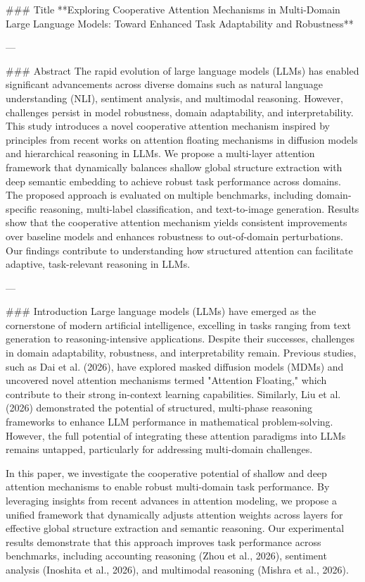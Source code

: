 ### Title  
**Exploring Cooperative Attention Mechanisms in Multi-Domain Large Language Models: Toward Enhanced Task Adaptability and Robustness**

---

### Abstract  
The rapid evolution of large language models (LLMs) has enabled significant advancements across diverse domains such as natural language understanding (NLI), sentiment analysis, and multimodal reasoning. However, challenges persist in model robustness, domain adaptability, and interpretability. This study introduces a novel cooperative attention mechanism inspired by principles from recent works on attention floating mechanisms in diffusion models and hierarchical reasoning in LLMs. We propose a multi-layer attention framework that dynamically balances shallow global structure extraction with deep semantic embedding to achieve robust task performance across domains. The proposed approach is evaluated on multiple benchmarks, including domain-specific reasoning, multi-label classification, and text-to-image generation. Results show that the cooperative attention mechanism yields consistent improvements over baseline models and enhances robustness to out-of-domain perturbations. Our findings contribute to understanding how structured attention can facilitate adaptive, task-relevant reasoning in LLMs.

---

### Introduction  
Large language models (LLMs) have emerged as the cornerstone of modern artificial intelligence, excelling in tasks ranging from text generation to reasoning-intensive applications. Despite their successes, challenges in domain adaptability, robustness, and interpretability remain. Previous studies, such as Dai et al. (2026), have explored masked diffusion models (MDMs) and uncovered novel attention mechanisms termed "Attention Floating," which contribute to their strong in-context learning capabilities. Similarly, Liu et al. (2026) demonstrated the potential of structured, multi-phase reasoning frameworks to enhance LLM performance in mathematical problem-solving. However, the full potential of integrating these attention paradigms into LLMs remains untapped, particularly for addressing multi-domain challenges.

In this paper, we investigate the cooperative potential of shallow and deep attention mechanisms to enable robust multi-domain task performance. By leveraging insights from recent advances in attention modeling, we propose a unified framework that dynamically adjusts attention weights across layers for effective global structure extraction and semantic reasoning. Our experimental results demonstrate that this approach improves task performance across benchmarks, including accounting reasoning (Zhou et al., 2026), sentiment analysis (Inoshita et al., 2026), and multimodal reasoning (Mishra et al., 2026).

